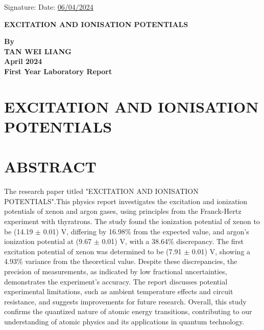 \documentclass[a4paper,11pt]{article}
\begin{document}
Signature: \hrulefill \hfill Date: \uline{06/04/2024}

\newpage
\begin{center}
\vspace*{1cm}
\textbf{\Large EXCITATION AND IONISATION POTENTIALS}

\vspace{3.0cm}
\textbf{By}\\

\vspace{3.0cm}
\textbf{TAN WEI LIANG} \\

\vspace{3.0cm}
\textbf{April 2024}\\

\vfill
\textbf{\large First Year Laboratory Report}
\end{center}


\newpage
{}
\section*{\large \center EXCITATION AND IONISATION POTENTIALS}
\section*{\large \center ABSTRACT}
\label{sec:ABSTRACT}
The research paper titled "EXCITATION AND IONISATION POTENTIALS".This physics report investigates the excitation and ionization potentials of xenon and argon gases, using principles from the Franck-Hertz experiment with thyratrons. The study found the ionization potential of xenon to be (14.19 $\pm$ 0.01) V, differing by 16.98\% from the expected value, and argon's ionization potential at (9.67 $\pm$ 0.01) V, with a 38.64\% discrepancy. The first excitation potential of xenon was determined to be (7.91 $\pm$ 0.01) V, showing a 4.93\% variance from the theoretical value. Despite these discrepancies, the precision of measurements, as indicated by low fractional uncertainties, demonstrates the experiment's accuracy. The report discusses potential experimental limitations, such as ambient temperature effects and circuit resistance, and suggests improvements for future research. Overall, this study confirms the quantized nature of atomic energy transitions, contributing to our understanding of atomic physics and its applications in quantum technology.  

\newpage 
{}
\end{document}
